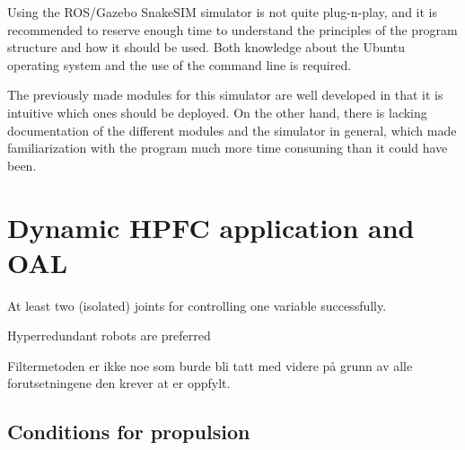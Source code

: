 Using the ROS/Gazebo SnakeSIM simulator is not quite plug-n-play, and it is recommended to reserve enough time to understand the principles of the program structure and how it should be used. Both knowledge about the Ubuntu operating system and the use of the command line is required.

The previously made modules for this simulator are well developed in that it is intuitive which ones should be deployed. On the other hand, there is lacking documentation of the different modules and the simulator in general, which made familiarization with the program much more time consuming than it could have been.

\section{Dynamic HPFC application and OAL}

At least two (isolated) joints for controlling one variable successfully.

Hyperredundant robots are preferred

Filtermetoden er ikke noe som burde bli tatt med videre på grunn av alle forutsetningene den krever at er oppfylt.

\subsection{Conditions for propulsion}